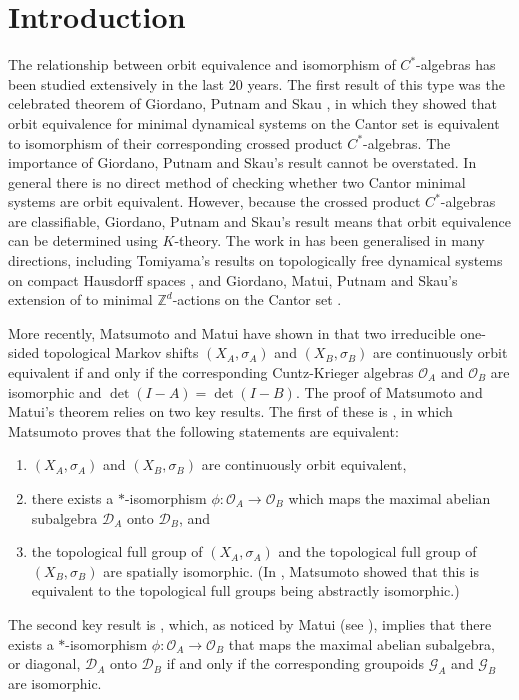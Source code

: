 \documentclass[12pt, a4paper]{amsart}
\numberwithin{equation}{section}
\theoremstyle{definition}
\theoremstyle{remark}
\begin{document}
\section{Introduction}\label{sec: intro}

The relationship between orbit equivalence and isomorphism of $C^*$-algebras 
has been studied extensively in the last 20 years. 
The first result of this type was the celebrated theorem of Giordano, Putnam 
and Skau \cite[Theorem 2.4]{GPS}, in which they showed that orbit equivalence for minimal dynamical systems on the Cantor set is equivalent to isomorphism of their corresponding crossed product $C^*$-algebras. 
The importance of Giordano, Putnam and Skau's result cannot be overstated. 
In general there is no direct method of checking whether two Cantor 
minimal systems are orbit equivalent. However, because the crossed product 
$C^*$-algebras are classifiable, Giordano, Putnam and Skau's result means that 
orbit equivalence can be determined using 
$K$-theory. The work in \cite{GPS} has been generalised in 
many directions, including Tomiyama's results on topologically free dynamical 
systems on compact Hausdorff spaces 
\cite{Tom}, and Giordano, Matui, Putnam and Skau's extension of \cite[Theorem 2.4]{GPS} to minimal 
${\mathbb{Z}}^d$-actions on the Cantor set \cite{GMPS}. 

More recently, Matsumoto and Matui have shown in \cite{MM} that two 
irreducible one-sided topological Markov shifts $(X_A,\sigma_A)$ and 
$(X_B,\sigma_B)$ are continuously orbit equivalent if and only if the 
corresponding Cuntz-Krieger algebras $\mathcal{O}_A$ and $\mathcal{O}_B$ are 
isomorphic and $\det(I-A)=\det(I-B)$. The proof of Matsumoto and Matui's 
theorem relies on two key results. The first of these is \cite[Theorem 
1.1]{Mat}, in which Matsumoto proves that the following statements are 
equivalent:
\begin{enumerate}
\item $(X_A,\sigma_A)$ and $(X_B,\sigma_B)$ are continuously orbit equivalent,
\item there exists a $*$-isomorphism $\phi:\mathcal{O}_A\to\mathcal{O}_B$ which maps the maximal abelian subalgebra $\mathcal{D}_A$ onto $\mathcal{D}_B$, and 
\item the topological full group of $(X_A,\sigma_A)$ and the topological full group of $(X_B,\sigma_B)$ are spatially isomorphic. (In \cite[Theorem 1.1]{Mat3}, Matsumoto showed that this is equivalent to the topological full groups being abstractly isomorphic.)
\end{enumerate}
The second key result is \cite[Proposition 4.13]{Ren2}, which, as noticed by 
Matui (see \cite[Theorem 5.1]{Matui}), implies that there exists a 
$*$-isomorphism $\phi:\mathcal{O}_A\to\mathcal{O}_B$ that maps the maximal 
abelian subalgebra, or diagonal, $\mathcal{D}_A$ onto $\mathcal{D}_B$ if and 
only if the corresponding groupoids $\mathcal{G}_A$ and $\mathcal{G}_B$ are 
isomorphic.
\end{document}
